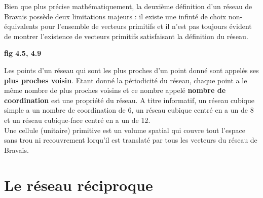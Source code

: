 Bien que plus précise mathématiquement, la deuxième définition d'un réseau de Bravais
possède deux limitations majeurs : il existe une infinté de choix non-équivalents
pour l'ensemble de vecteurs primitifs et il n'est pas toujours évident de montrer
l'existence de vecteurs primitifs satisfaisant la définition du réseau.

\begin{center}
\textbf{fig 4.5, 4.9}
\end{center}


Les points d'un réseau qui sont les plus proches d'un point donné sont appelés
ses \textbf{plus proches voisin}. Etant donné la périodicité du réseau, chaque
point a le même nombre de plus proches voisins et ce nombre appelé \textbf{
nombre de coordination} est une propriété du réseau. A titre informatif, un réseau
cubique simple a un nombre de coordination de 6, un réseau cubique centré en a un de
8 et un réseau cubique-face centré en a un de 12.\\

Une cellule (unitaire) primitive est un volume spatial qui couvre tout l'espace
sans trou ni recouvrement lorqu'il est translaté par tous les vecteurs du réseau 
de Bravais.

\section{Le réseau réciproque}